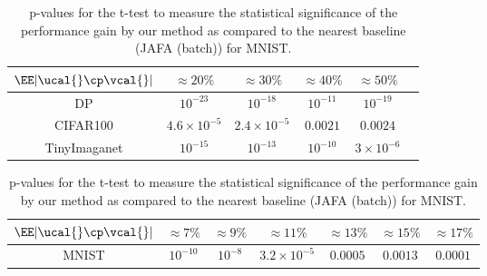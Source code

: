 \documentclass[letterpaper]{article}
\begin{document}
\begin{table}[!htb]
    \centering
\begin{tabular}{ |c|c|c|c|c|c| }
\hline
$\EE|\ucal{} \cp \vcal{}|$ & $\approx 20 \%$ & $\approx 30 \%$ & $\approx 40 \%$ & $\approx 50 \%$ \\
 \hline
 DP & $10^{-23}$ & $10^{-18}$ & $10^{-11}$ & $10^{-19}$ \\
 \hline
  CIFAR100 & $4.6\times 10^{-5}$ & $2.4\times 10^{-5}$ & $ 0.0021$ & $ 0.0024$ \\
 \hline
 TinyImaganet & $10^{-15}$ & $10^{-13}$ & $10^{-10}$ & $3\times10^{-6}$ \\
 \hline
\end{tabular}
\caption{p-values for the t-test to measure the statistical significance of the performance gain by our method as compared to the nearest baseline (JAFA (batch)) for DP, CIFAR100 and TinyImagenet.}
\label{table:p_values_dp}

\begin{tabular}{ |c|c|c|c|c|c|c| }
\hline
$\EE|\ucal{} \cp \vcal{}|$ & $\approx 7 \%$ & $\approx 9 \%$ & $\approx 11 \%$ & $\approx 13 \%$ & $\approx 15 \%$ & $\approx 17 \%$\\
 \hline
 MNIST & $10^{-10}$ & $10^{-8}$ & $3.2 \times 10^{-5}$ & $0.0005$ & $0.0013$ & $0.0001$ \\
 \hline
\end{tabular}
\caption{p-values for the t-test to measure the statistical significance of the performance gain by our method as compared to the nearest baseline (JAFA (batch)) for MNIST.}
\label{table:p_values_mnist}
\end{table}
\end{document}
